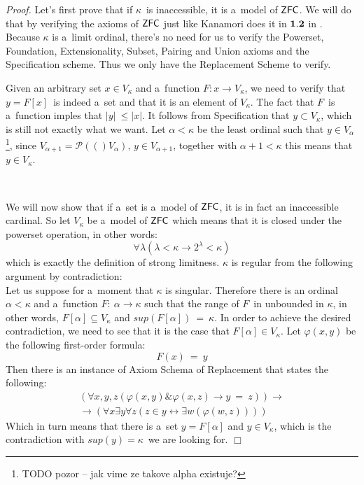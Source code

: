 \documentclass[12pt,a4paper]{article}
\newenvironment{proof}
{\noindent \textit{Proof.}}
{\hspace*{\fill} $\Box$}
\newcommand{\power}[1]{\ensuremath{\mathscr{P}} (#1)}
\renewcommand{\iff}{\leftrightarrow}
\newcommand{\then}{\rightarrow}
\begin{document}
\begin{proof}
Let's first prove that if $\kappa$ is inaccessible, it is a~model of $\sf{ZFC}$. We will do that by verifying the axioms of $\sf{ZFC}$ just like Kanamori does it in $\bold{1.2}$ in \cite{KanamoriBook}. Because $\kappa$ is a~limit ordinal, there's no need for us to verify the Powerset, Foundation, Extensionality, Subset, Pairing and Union axioms and the Specification scheme. Thus we only have the Replacement Scheme to verify. 

Given an arbitrary set $x \in V_\kappa$ and a~function $F: x \then V_\kappa$, we need to verify that $y = F[x]$ is indeed a~set and that it is an element of $V_\kappa$. The fact that $F$ is a~function imples that $|y|\ \leq |x|$. It follows from Specification that $y \subset V_\kappa$, which is still not exactly what we want. Let $\alpha < \kappa$ be the least ordinal such that $y \in V_\alpha$\footnote{TODO pozor -- jak vime ze takove alpha existuje?}, since $V_{\alpha+1} = \power(V_\alpha)$, $y \in V_{\alpha+1}$, together with $\alpha+1 < \kappa$ this means that $y \in V_\kappa$.

\

We will now show that if a~set is a~model of $\sf{ZFC}$, it is in fact an inaccessible cardinal. So let $V_\kappa$ be a~model of $\sf{ZFC}$ which means that it is closed under the powerset operation, in other words:
\begin{equation}
\forall \lambda (\lambda < \kappa \then 2^{\lambda} < \kappa)
\end{equation}
which is exactly the definition of strong limitness. $\kappa$ is regular from the following argument by contradiction:\\
Let us suppose for a~moment that $\kappa$ is singular. Therefore there is an ordinal $\alpha < \kappa$ and a~function $F:\ \alpha \then \kappa$ such that the range of $F$ in unbounded in $\kappa$, in other words, $F[\alpha] \subseteq V_\kappa$ and $sup(F[\alpha])\ =\ \kappa$. In order to achieve the desired contradiction, we need to see that it is the case that $F[\alpha] \in V_\kappa$. Let $\varphi(x, y)$ be the following first-order formula:
\begin{equation}
F(x)\ =\ y
\end{equation}
Then there is an instance of  Axiom Schema of Replacement that states the following:
\begin{equation}
\begin{split}
(\forall x, y, z(\varphi(x, y) \& \varphi(x, z) \then y\ =\ z)) \then \\
\then (\forall x \exists y \forall z (z \in y \iff \exists w (\varphi(w, z))))
\end{split}
\end{equation}
Which in turn means that there is a~set $y = F[\alpha]$ and $y \in V_\kappa$, which is the contradiction with $sup(y) = \kappa$ we are looking for.
\end{proof}
\end{document}
